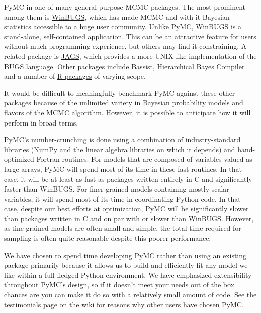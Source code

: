 PyMC in one of many general-purpose MCMC packages. The most prominent among them is \href{http://www.mrc-bsu.cam.ac.uk/bugs/}{WinBUGS}, which has made MCMC and with it Bayesian statistics accessible to a huge user community. Unlike PyMC, WinBUGS is a stand-alone, self-contained application. This can be an attractive feature for users without much programming experience, but others may find it constraining. A related package is \href{http://www-ice.iarc.fr/~martyn/software/jags/}{JAGS}, which provides a more UNIX-like implementation of the BUGS language. Other packages include \href{http://www.cs.helsinki.fi/research/fdk/bassist/}{Bassist}, \href{http://www.cs.utah.edu/~hal/HBC/}{Hierarchical Bayes Compiler} and a number of \href{http://cran.r-project.org/web/packages/}{R packages} of varying scope.

It would be difficult to meaningfully benchmark PyMC against these other packages because of the unlimited variety in Bayesian probability models and flavors of the MCMC algorithm. However, it is possible to anticipate how it will perform in broad terms.

PyMC's number-crunching is done using a combination of industry-standard libraries (NumPy and the linear algebra libraries on which it depends) and hand-optimized Fortran routines. For models that are composed of variables valued as large arrays, PyMC will spend most of its time in these fast routines. In that case, it will be at least as fast as packages written entirely in C and significantly faster than WinBUGS. For finer-grained models containing mostly scalar variables, it will spend most of its time in coordinating Python code. In that case, despite our best efforts at optimization, PyMC will be significantly slower than packages written in C and on par with or slower than WinBUGS. However, as fine-grained models are often small and simple, the total time required for sampling is often quite reasonable despite this poorer performance.

We have chosen to spend time developing PyMC rather than using an existing package primarily because it allows us to build and efficiently fit any model we like within a full-fledged Python environment. We have emphasized extensibility throughout PyMC's design, so if it doesn't meet your needs out of the box chances are you can make it do so with a relatively small amount of code. See the \href{http://code.google.com/p/pymc/wiki/Testimonials}{testimonials} page on the wiki for reasons why other users have chosen PyMC.


